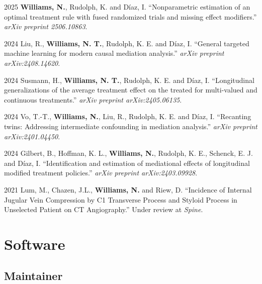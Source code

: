 \documentclass[12pt,letterpaper]{report}
\begin{document}
    \begin{tablist}
    
     \item[2025] \tab \textbf{Williams, N.}, Rudolph, K. and Díaz, I. \enquote{Nonparametric estimation of an optimal treatment rule with fused randomized trials and missing effect modifiers.} \textit{arXiv preprint 2506.10863}.
    
    \item[2024] \tab Liu, R., \textbf{Williams, N. T.}, Rudolph, K. E. and Díaz, I. \enquote{General targeted machine learning for modern causal mediation analysis.} \textit{arXiv preprint arXiv:2408.14620}.
    
    \item[2024] \tab Susmann, H., \textbf{Williams, N. T.}, Rudolph, K. E. and Díaz, I. \enquote{Longitudinal generalizations of the average treatment effect on the treated for multi-valued and continuous treatments.} \textit{arXiv preprint arXiv:2405.06135}.
    
    \item[2024] \tab Vo, T.-T., \textbf{Williams, N.}, Liu, R., Rudolph, K. E. and Díaz, I. \enquote{Recanting twins: Addressing intermediate confounding in mediation analysis.} \textit{arXiv preprint arXiv:2401.04450}.
    
    \item[2024] \tab Gilbert, B., Hoffman, K. L., \textbf{Williams, N.}, Rudolph, K. E., Schenck, E. J. and Díaz, I. \enquote{Identification and estimation of mediational effects of longitudinal modified treatment policies.} \textit{arXiv preprint arXiv:2403.09928}.
    
    \item[2021] \tab Lum, M., Chazen, J.L., \textbf{Williams, N.} and Riew, D. \enquote {Incidence of Internal Jugular Vein Compression by C1 Transverse Process and Styloid Process in Unselected Patient on CT Angiography.} Under review at \textit {Spine}.

    
    \end{tablist}
    
    \section*{Software}
    
    \subsection*{Maintainer}
    
\end{document}
